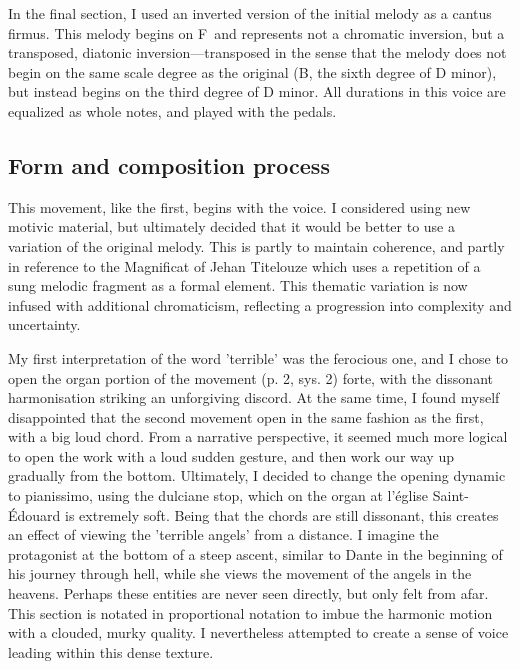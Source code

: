 \documentclass[12pt,twoside,maitrise]{dms_ks}
\theoremstyle{definition}
\begin{document}
In the final section, I used an inverted version of the initial melody as a cantus firmus.
This melody begins on F\na\ and represents not a chromatic inversion, but a transposed, diatonic inversion---transposed in the sense that the melody does not begin on the same scale degree as the original (B\fl, the sixth degree of D minor), but instead begins on the third degree of D minor. 
All durations in this voice are equalized as whole notes, and played with the pedals.

\subsection{Form and composition process}


This movement, like the first, begins with the voice.
I considered using new motivic material, but ultimately decided that it would be better to use a variation of the original melody.
This is partly to maintain coherence, and partly in reference to the Magnificat of Jehan Titelouze which uses a repetition of a sung melodic fragment as a formal element.
This thematic variation is now infused with additional chromaticism, reflecting a progression into complexity and uncertainty.


My first interpretation of the word 'terrible' was the ferocious one, and I chose to open the organ portion of the movement (p. 2, sys. 2) forte, with the dissonant harmonisation striking an unforgiving discord. 
At the same time, I found myself disappointed that the second movement open in the same fashion as the first, with a big loud chord.
From a narrative perspective, it seemed much more logical to open the work with a loud sudden gesture, and then work our way up gradually from the bottom.
Ultimately, I decided to change the opening dynamic to pianissimo, using the dulciane stop, which on the organ at l'église Saint-Édouard is extremely soft.
Being that the chords are still dissonant, this creates an effect of viewing the 'terrible angels' from a distance. 
I imagine the protagonist at the bottom of a steep ascent, similar to Dante in the beginning of his journey through hell, while she views the movement of the angels in the heavens.
Perhaps these entities are never seen directly, but only felt from afar.
This section is notated in proportional notation to imbue the harmonic motion with a clouded, murky quality.
I nevertheless attempted to create a sense of voice leading within this dense texture.
\end{document}
